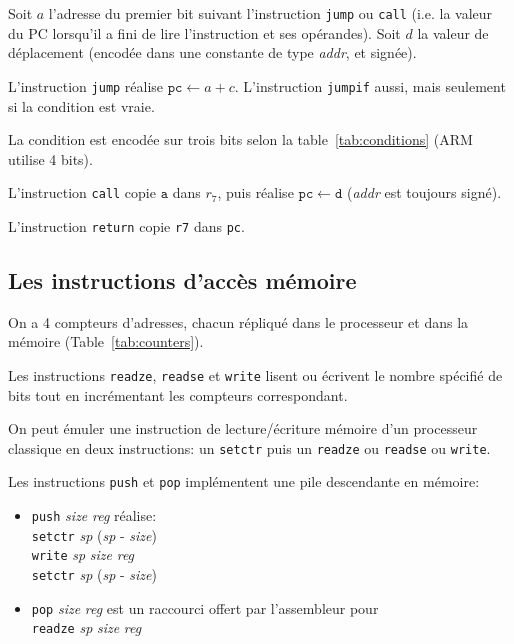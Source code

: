 \documentclass[architecture]{compas2018}
\begin{document}
Soit $a$ l'adresse du premier bit suivant l'instruction \texttt{jump} ou \texttt{call} (i.e. la valeur du PC lorsqu'il a fini de lire l'instruction et ses opérandes).
Soit $d$ la valeur de déplacement (encodée dans une constante de type \textit{addr}, et signée).

L'instruction \texttt{jump} réalise $\mathtt{pc}\leftarrow a + c$.
L'instruction \texttt{jumpif} aussi, mais seulement si la condition est vraie.

La condition  est encodée sur trois bits  selon la table~\ref{tab:conditions} (ARM utilise 4 bits).

L'instruction \texttt{call} copie $\texttt{a}$ dans $r_{7}$, puis réalise $\mathtt{pc} \leftarrow \texttt{d}$
(\emph{addr} est toujours signé).

L'instruction \texttt{return} copie \texttt{r7} dans \texttt{pc}.


\subsection{Les instructions d'accès mémoire}
\label{sec:mem}



On a 4 compteurs d'adresses, chacun  répliqué dans le processeur et dans la mémoire (Table~\ref{tab:counters}).


Les instructions \texttt{readze}, \texttt{readse} et \texttt{write} lisent ou écrivent le nombre spécifié de bits tout en incrémentant les compteurs correspondant.

On peut émuler une instruction de lecture/écriture mémoire d'un processeur classique en deux instructions: un \texttt{setctr} puis un \texttt{readze} ou \texttt{readse} ou \texttt{write}.

Les instructions \texttt{push} et \texttt{pop} implémentent une pile descendante en mémoire: 
\begin{itemize}
\item \texttt{push} \emph{size} \emph{reg} réalise: \\
   \texttt{setctr} \textit{sp} (\textit{sp} - \textit{size})\\ \texttt{write}  \textit{sp} \textit{size} \textit{reg} \\ \texttt{setctr} \textit{sp} (\textit{sp} - \textit{size})
\item \texttt{pop} \emph{size} \emph{reg} est un raccourci offert par l'assembleur pour \\\texttt{readze} \textit{sp} \emph{size} \emph{reg}\\
  
\end{itemize}
\end{document}
